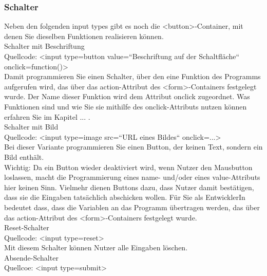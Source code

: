 \subsubsection{Schalter}

Neben den folgenden input types gibt es noch die <button>-Container, mit denen Sie dieselben Funktionen realisieren können.\\

Schalter mit Beschriftung\\

Quellcode: <input type=button value=“Beschriftung auf der Schaltfläche“ onclick=function()>\\

Damit programmieren Sie einen Schalter, über den eine Funktion des Programms aufgerufen wird, das über das action-Attribut des <form>-Containers festgelegt wurde. Der Name dieser Funktion wird dem Attribut onclick zugeordnet. Was Funktionen sind und wie Sie sie mithilfe des onclick-Attributs nutzen können erfahren Sie im Kapitel ... .\\

Schalter mit Bild\\

Quellcode: <input type=image src=“URL eines Bildes“ onclick=...>\\

Bei dieser Variante programmieren Sie einen Button, der keinen Text, sondern ein Bild enthält.\\

Wichtig: Da ein Button wieder deaktiviert wird, wenn Nutzer den Mausbutton loslassen, macht die Programmierung eines name- und/oder eines value-Attributs hier keinen Sinn. Vielmehr dienen Buttons dazu, dass Nutzer damit bestätigen, dass sie die Eingaben tatsächlich abschicken wollen. Für Sie als EntwicklerIn bedeutet dass, dass die Variablen an das Programm übertragen werden, das über das action-Attribut des <form>-Containers festgelegt wurde.\\

Reset-Schalter\\

Quellcode: <input type=reset>\\

Mit diesem Schalter können Nutzer alle Eingaben löschen.\\

Absende-Schalter\\

Quellcoe: <input type=submit>\\

